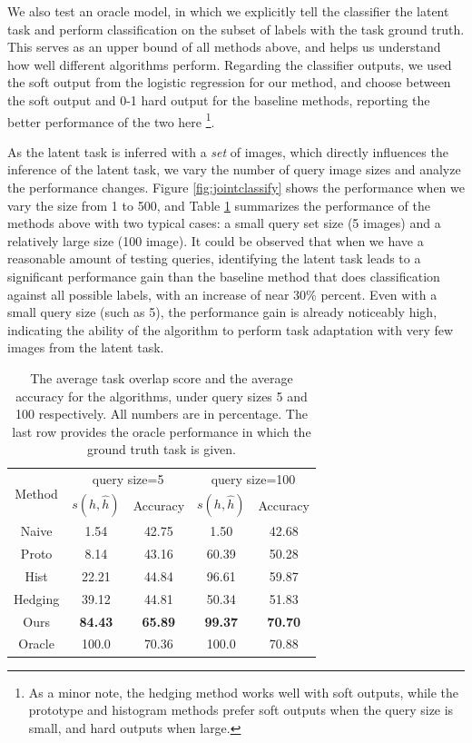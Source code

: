 We also test an oracle model, in which we explicitly tell the classifier the latent task and perform classification on the subset of labels with the task ground truth. This serves as an upper bound of all methods above, and helps us understand how well different algorithms perform. Regarding the classifier outputs, we used the soft output from the logistic regression for our method, and choose between the soft output and 0-1 hard output for the baseline methods, reporting the better performance of the two here \footnote{As a minor note, the hedging method works well with soft outputs, while the prototype and histogram methods prefer soft outputs when the query size is small, and hard outputs when large.}.

As the latent task is inferred with a \emph{set} of images, which directly influences the inference of the latent task, we vary the number of query image sizes and analyze the performance changes.
Figure \ref{fig:jointclassify} shows the performance when we vary the size from 1 to 500, and Table \ref{tab:jointclassify} summarizes the performance of the methods above with two typical cases: a small query set size (5 images) and a relatively large size (100 image). It could be observed that when we have a reasonable amount of testing queries, identifying the latent task leads to a significant performance gain than the baseline method that does classification against all possible labels, with an increase of near 30\% percent. Even with a small query size (such as 5), the performance gain is already noticeably high, indicating the ability of the algorithm to perform task adaptation with very few images from the latent task.

\begin{table}
    \centering
    \begin{tabular}{c|cc|cc}
        \hline \hline
        \multirow{2}{*}{Method} & \multicolumn{2}{c|}{query size=5} & \multicolumn{2}{c}{query size=100}\\
        \cline{2-5}
        & $s(h, \hat{h})$ & Accuracy &  $s(h, \hat{h})$ & Accuracy \\
        \hline
        Naive   & 1.54 & 42.75 & 1.50 & 42.68 \\
        Proto   & 8.14 & 43.16 & 60.39 & 50.28 \\
        Hist    & 22.21 & 44.84 & 96.61 & 59.87 \\
        Hedging & 39.12 & 44.81 & 50.34 & 51.83 \\
        Ours    & {\bfseries 84.43} & {\bfseries 65.89} & {\bfseries 99.37} & {\bfseries 70.70} \\
        \hline \hline
        Oracle  & 100.0 & 70.36 & 100.0 & 70.88 \\
        \hline \hline
    \end{tabular}
    \caption{The average task overlap score and the average accuracy for the algorithms, under query sizes 5 and 100 respectively. All numbers are in percentage. The last row provides the oracle performance in which the ground truth task is given.}\label{tab:jointclassify}
\end{table}

